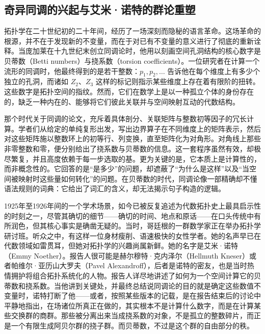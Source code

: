 \documentclass[12pt,a4paper]{article}
\begin{document}
\subsection{奇异同调的兴起与艾米·诺特的群论重塑}


拓扑学在二十世纪初的二十年间，经历了一场深刻而隐秘的语言革命。这场革命的根源，并不在于发现新的不变量，而在于对已有不变量的意义进行了彻底的重新诠释。当庞加莱在十九世纪末创立同调论时，他用以刻画空间孔洞结构的核心数字是贝蒂数（Betti numbers）与挠系数（torsion coefficients）。一位研究者在计算一个流形的同调时，他最终得到的是若干整数：$p_1, p_2, \dots$ 告诉他在每个维度上有多少个独立的孔洞，而诸如 $Z_2$、$Z_3$ 这样的标记则指示某些维度上存在着有限阶的扭转。这些数字是拓扑空间的指纹。然而，它们在数学上是以一种孤立个体的身份存在的，缺乏一种内在的、能够将它们彼此关联并与空间映射互动的代数结构。

那个时代关于同调的论文，充斥着具体剖分、关联矩阵与整数初等因子的冗长计算。学者们从给定的单纯复形出发，写出边界算子在不同维度上的矩阵表示，然后对这些矩阵施以整数环上的初等行、列变换，直至矩阵化为对角形。对角线上那些非零整数和零，便分别给出了挠系数与贝蒂数的信息。这一套程序虽然有效，却极尽繁复，并且高度依赖于每一步选取的基。更为关键的是，它本质上是计算性的，而非概念性的。它回答的是“是多少”的问题，却遮蔽了“为什么是这样”以及“当空间被映射时这些量如何转化”的问题。在贝蒂数的时代，同调论像一部精确却不懂语法规则的词典：它给出了词汇的含义，却无法揭示句子构造的逻辑。

1925年至1926年间的一个学术场景，如今已被反复追述为代数拓扑史上最具启示性的时刻之一，尽管其确切的细节——确切的时间、地点和原话——在口头传统中有所润色，但其核心事实是确凿无疑的。当时，哥廷根的一群数学家正在举办拓扑学研讨班。听众之中，有这样一位身材瘦削、语速极快的女性学者。她的名声早已在代数领域如雷贯耳，但她对拓扑学的兴趣尚属新鲜。她的名字是艾米·诺特（Emmy Noether）。报告人很可能是赫尔穆特·克内泽尔（Hellmuth Kneser）或者帕维尔·亚历山大罗夫（Pavel Alexandroff），后者是诺特的密友，也是当时热情拥护将组合拓扑系统化的人物。报告人详尽地讲述了如何为一个空间计算它的贝蒂数和挠系数。当他讲到关键处，并最终总结说同调论的目的就是确定这些数值不变量时，诺特打断了他——或者，按照某些版本的记载，是在报告结束后的讨论中平静地指出，在场诸位所真正在做的，其实根本不是计算什么数字，而是在计算某些交换群的商群。那些被分离出来当成挠系数的对象，不是孤立的整数碎片，而正是一个有限生成阿贝尔群的挠子群。而贝蒂数，不过是这个群的自由部分的秩。
\end{document}
